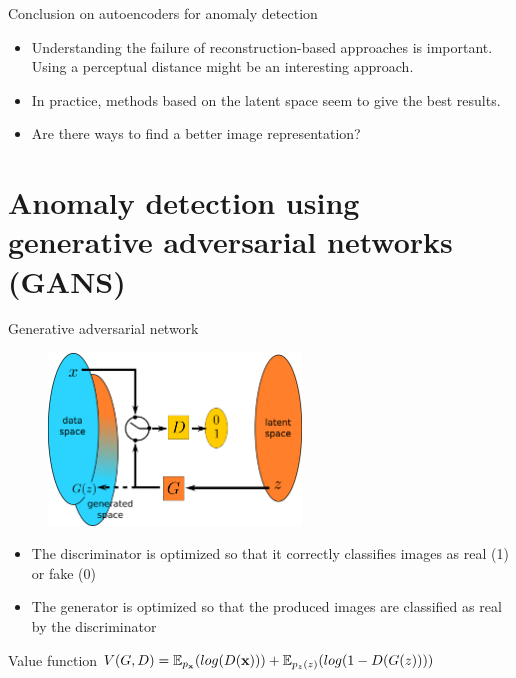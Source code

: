 \documentclass[xcolor=pdftex,dvipsnames,table,mathserif]{beamer}
\begin{document}
\begin{frame}{Conclusion on autoencoders for anomaly detection}

  \begin{itemize}
  \item Understanding the failure of reconstruction-based approaches is important. Using a perceptual distance might be an interesting approach.
  \item In practice, methods based on the latent space seem to give the best results.
  \item Are there ways to find a better image representation?
  \end{itemize}

\end{frame}


\section{Anomaly detection using generative adversarial networks (GANS)}

\begin{frame}{Generative adversarial network \cite{goodfellow_generative_2014}}

  \begin{figure}[ht]
    \centering
    \includegraphics[width=0.6\textwidth]{gan2}
  \end{figure}

  \begin{itemize}
  \item The discriminator is optimized so that it correctly classifies images as real (1) or fake (0)
  \item The generator is optimized so that the produced images are classified as real by the discriminator
  \end{itemize}

  \begin{block}{Value function}
    $V(G,D) = \mathbb{E}_{p_{\mathbf{x}}}(log(D(\mathbf{x}))) + \mathbb{E}_{p_z(z)}(log(1 - D(G(z))))$
  \end{block}

\end{frame}
\end{document}
